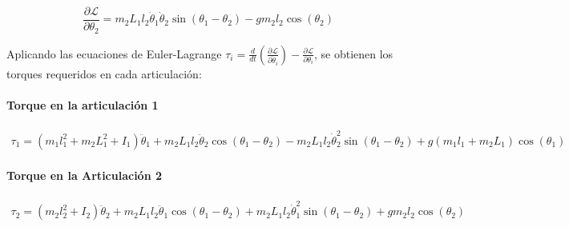 \begin{equation}
\frac{\partial \mathcal{L}}{\partial \theta_2} = m_2L_1l_2\dot{\theta}_1\dot{\theta}_2\sin(\theta_1 - \theta_2) - gm_2l_2\cos(\theta_2)
\end{equation}

Aplicando las ecuaciones de Euler-Lagrange $\tau_i = \frac{d}{dt}\left(\frac{\partial \mathcal{L}}{\partial \dot{\theta}_i}\right) - \frac{\partial \mathcal{L}}{\partial \theta_i}$, se obtienen los torques requeridos en cada articulación:

\paragraph{Torque en la articulación 1}


\begin{multline}
\tau_1 = (m_1l_1^2 + m_2L_1^2 + I_1)\ddot{\theta}_1 + m_2L_1l_2\ddot{\theta}_2\cos(\theta_1 - \theta_2) - m_2L_1l_2\dot{\theta}_2^2\sin(\theta_1 - \theta_2) + g(m_1l_1 + m_2L_1)\cos(\theta_1)
\label{ec:torqueT1}
\end{multline}

\paragraph{Torque en la Articulación 2}

\begin{multline}
\tau_2 = (m_2l_2^2 + I_2)\ddot{\theta}_2 + m_2L_1l_2\ddot{\theta}_1\cos(\theta_1 - \theta_2) + m_2L_1l_2\dot{\theta}_1^2\sin(\theta_1 - \theta_2) + gm_2l_2\cos(\theta_2)
\label{ec:torqueT2}
\end{multline}
